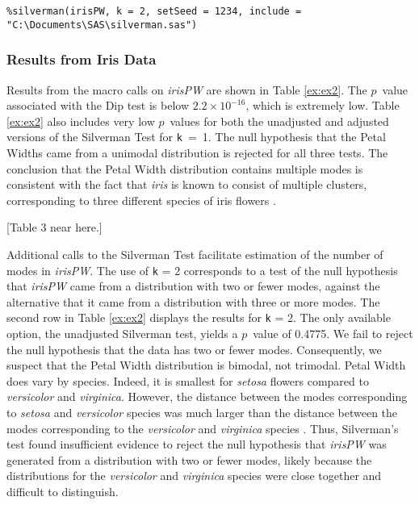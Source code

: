 \documentclass[]{interact}
\theoremstyle{plain}%
\theoremstyle{definition}
\theoremstyle{remark}
\begin{document}
\texttt{\%silverman(irisPW, k = 2, setSeed = 1234, include = "C:\textbackslash Documents\textbackslash SAS\textbackslash silverman.sas")}


\subsubsection{Results from Iris Data}
Results from the macro calls on {\it irisPW} are shown in Table \ref{ex:ex2}. %
The $p$~value associated with the Dip test is below $2.2\times10^{-16}$, which is extremely low. Table \ref{ex:ex2} also includes very low $p$~values for both the unadjusted and adjusted versions of the Silverman Test for \texttt{k}~=~1. The null hypothesis that the Petal Widths came from a unimodal distribution is rejected for all three tests. The conclusion that the Petal Width distribution contains multiple modes is consistent with the fact that {\it iris} is known to consist of multiple clusters, corresponding to three different species of iris flowers \citep{fisher1936use}. 

[Table 3 near here.]

Additional calls to the Silverman Test facilitate estimation of the number of modes in {\it irisPW}. The use of \texttt{k} = 2 corresponds to a test of the null hypothesis that {\it irisPW} came from a distribution with two or fewer modes, against the alternative that it came from a distribution with three or more modes. %
The second row in Table \ref{ex:ex2} displays the results for \texttt{k} = 2. %
The only available option, the unadjusted Silverman test, yields a %
$p$~value of 0.4775. We fail to reject the null hypothesis that the data has two or fewer modes. %
Consequently, we suspect that the Petal Width distribution is bimodal, not trimodal. Petal Width does vary by species. Indeed, it is smallest for {\it setosa} flowers compared to {\it versicolor} and {\it virginica}. However, the distance between the modes corresponding to {\it setosa} and {\it versicolor} species was much larger than the distance between the modes corresponding to the {\it versicolor} and {\it virginica} species \citep{fisher1936use}. Thus, Silverman's test found insufficient evidence to reject the null hypothesis that {\it irisPW} was generated from a distribution with two or fewer modes, likely because the distributions for the {\it versicolor} and {\it virginica} species were close together and difficult to distinguish.
\end{document}
